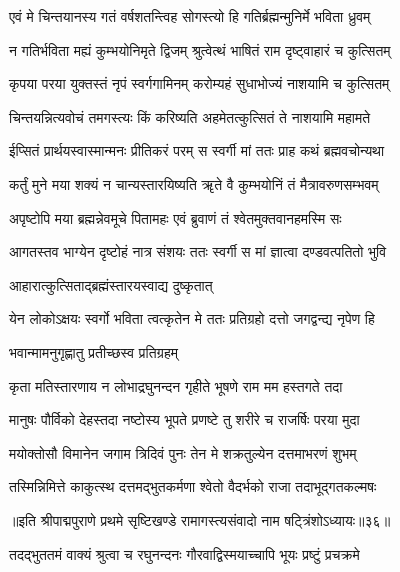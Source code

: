 \twolineshloka
{एवं मे चिन्तयानस्य गतं वर्षशतन्त्विह}
{सोगस्त्यो हि गतिर्ब्रह्मन्मुनिर्मे भविता ध्रुवम्}%

\twolineshloka
{न गतिर्भविता मह्यं कुम्भयोनिमृते द्विजम्}
{श्रुत्वेत्थं भाषितं राम दृष्ट्वाहारं च कुत्सितम्}%

\twolineshloka
{कृपया परया युक्तस्तं नृपं स्वर्गगामिनम्}
{करोम्यहं सुधाभोज्यं नाशयामि च कुत्सितम्}%

\twolineshloka
{चिन्तयन्नित्यवोचं तमगस्त्यः किं करिष्यति}
{अहमेतत्कुत्सितं ते नाशयामि महामते}%

\twolineshloka
{ईप्सितं प्रार्थयस्वास्मान्मनः प्रीतिकरं परम्}
{स स्वर्गी मां ततः प्राह कथं ब्रह्मवचोन्यथा}%

\twolineshloka
{कर्तुं मुने मया शक्यं न चान्यस्तारयिष्यति}
{ॠते वै कुम्भयोनिं तं मैत्रावरुणसम्भवम्}%

\twolineshloka
{अपृष्टोपि मया ब्रह्मन्नेवमूचे पितामहः}
{एवं ब्रुवाणं तं श्वेतमुक्तवानहमस्मि सः}%

\twolineshloka
{आगतस्तव भाग्येन दृष्टोहं नात्र संशयः}
{ततः स्वर्गी स मां ज्ञात्वा दण्डवत्पतितो भुवि}%



\onelineshloka
{आहारात्कुत्सिताद्ब्रह्मंस्तारयस्वाद्य दुष्कृतात्}%

\twolineshloka
{येन लोकोऽक्षयः स्वर्गो भविता त्वत्कृतेन मे}
{ततः प्रतिग्रहो दत्तो जगद्वन्द्य नृपेण हि}%


\onelineshloka
{भवान्मामनुगृह्णातु प्रतीच्छस्व प्रतिग्रहम्}%

\twolineshloka
{कृता मतिस्तारणाय न लोभाद्रघुनन्दन}
{गृहीते भूषणे राम मम हस्तगते तदा}%

\twolineshloka
{मानुषः पौर्विको देहस्तदा नष्टोस्य भूपते}
{प्रणष्टे तु शरीरे च राजर्षिः परया मुदा}%

\twolineshloka
{मयोक्तोसौ विमानेन जगाम त्रिदिवं पुनः}
{तेन मे शक्रतुल्येन दत्तमाभरणं शुभम्}%

\twolineshloka
{तस्मिन्निमित्ते काकुत्स्थ दत्तमद्भुतकर्मणा}
{श्वेतो वैदर्भको राजा तदाभूद्गतकल्मषः}%

{॥इति श्रीपाद्मपुराणे प्रथमे सृष्टिखण्डे रामागस्त्यसंवादो नाम षट्त्रिंशोऽध्यायः॥३६॥}



\twolineshloka
{तदद्भुततमं वाक्यं श्रुत्वा च रघुनन्दनः}
{गौरवाद्विस्मयाच्चापि भूयः प्रष्टुं प्रचक्रमे}%

